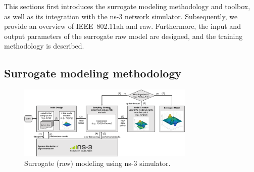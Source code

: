 




This sections first introduces the surrogate modeling methodology 
and toolbox, as well as its integration with the ns-3 network
simulator. Subsequently, we provide an overview of  IEEE~802.11ah and \gls{raw}. Furthermore, the input and output parameters of the surrogate \gls{raw} model are designed, and the training methodology is described. 


\subsection{Surrogate modeling methodology}


\begin{figure}[t]
  \centering
  \includegraphics[width=0.75\textwidth]{figures/surrogate_modeling_approach_raw}
  \caption{Surrogate (\gls{raw}) modeling using ns-3 simulator. \label{fig:sumo-ns3}}
\end{figure}

